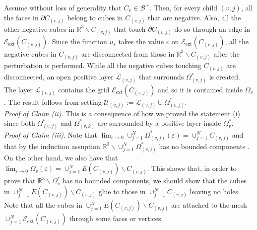 \documentclass[11pt,reqno]{amsart}
\newcommand{\R}{{\mathbb R}}
\newcommand{\ep}{\varepsilon}
\theoremstyle{definition}
\begin{document}
 Assume without loss of generality that $C_v \in \mathcal B^+$.  Then, for every child $(v,j)$, all the faces in $\partial C_{(v,j)}$ belong to cubes in $C_{(v,j)}$ that are negative. Also, all the other negative cubes in $\R^3 \backslash C_{(v,j)}$ that touch  $\partial C_{(v,j)}$ do so through an edge in $\mathcal E_{\text{ext}} (C_{(v,j)})$. Since the function $u_\ep$ takes the value $\ep$ on $\mathcal E_{\text{ext}} (C_{(v,j)})$, all the negative cubes in $ C_{(v,j)}$ are disconnected from those in $\R^3 \backslash C_{(v,j)}$ after the perturbation is performed. While all the negative cubes touching  $ C_{(v,j)}$  are disconnected, an open positive layer $\mathcal L_{(v,j)}$ that surrounds $\Omega^*_{(v,j)}$ is created. The layer $\mathcal L_{(v,j)}$ contains the grid $\mathcal E_{\text{ext}} (C_{(v,j)})$ and so it is  contained inside $\Omega_v$. The result follows from setting  $\mathcal U_{(v,j)}:=\mathcal L_{(v,j)} \cup \Omega^*_{(v,j)} $. \\
 
\emph{Proof of Claim (ii)}.  This is a consequence of how we proved the statement (i) since both  $\Omega_{(v,j)}^*$ and  $\Omega_{(v,k)}^*$ are surrounded by  a positive layer inside $\Omega_v^*$.  \ \\
 
 \emph{Proof of Claim (iii)}. Note that $\lim_{\ep \to 0} \cup_{j=1}^N  \Omega^*_{(v,j)}(\ep)=\cup_{j=1}^N C_{(v,j)}$ and that by the induction assuption $\R^3 \backslash \cup_{j=1}^N  \Omega^*_{(v,j)}$ has no bounded components . On the other hand, we also have that $\lim_{\ep \to 0} \Omega_v(\ep)= \cup_{j=1}^N E(C_{(v,j)})\backslash C_{(v,j)}.$ This shows that, in order to prove that $\R^3 \backslash \Omega_v^*$ has no bounded components, we should show that the cubes in $\cup_{j=1}^N E(C_{(v,j)})\backslash C_{(v,j)}$ glue to those in  $\cup_{j=1}^N C_{(v,j)}$ leaving no holes. 
    Note that all the cubes in $\cup_{j=1}^N E(C_{(v,j)})\backslash C_{(v,j)}$  are attached to  the mesh $\cup_{j=1}^N \mathcal E_{\text{ext}} (C_{(v,j)})$  through some faces or vertices.   
  
\end{document}
